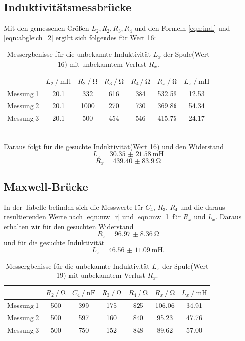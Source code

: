 \subsection{Induktivitätsmessbrücke}
Mit den gemessenen Größen $L_2, R_2, R_3, R_4$ und den Formeln \eqref{eqn:indl} und \eqref{eqn:abgleich_2} ergibt sich folgendes für Wert 16:
\begin{table}
  \centering
  \label{tab:c_16}
  \begin{tabular}{c|cccccc}
    \toprule
    & {$L_2 \:/\: \si{\milli\henry}$} & {$R_2\:/\: \si{\ohm}$} & {$R_3\:/\: \si{\ohm}$} & {$R_4\:/\: \si{\ohm}$} & {$R_x\:/\: \si{\ohm}$} & {$L_x \:/\: \si{\milli \henry}$} \\
    \midrule
    {Messung 1} & 20.1 & 332 & 616 & 384 & 532.58 & 12.53\\
    {Messung 2} & 20.1 & 1000 & 270 & 730 & 369.86 & 54.34\\
    {Messung 3} & 20.1 & 500 & 454 & 546 & 415.75 & 24.17\\
    \bottomrule
  \end{tabular}
  \caption{Messergbenisse für die unbekannte Induktivität $L_x$ der Spule(Wert 16) mit unbekanntem Verlust $R_x$.}
\end{table}
\\
Daraus folgt für die gesuchte Induktivität(Wert 16) und den Widerstand
\begin{equation*}
  L_x = \SI{30.35(2158)}{\milli\henry}
\end{equation*}
\begin{equation*}
  R_x = \SI{439.40(8390)}{\ohm}
\end{equation*}
\subsection{Maxwell-Brücke}
In der Tabelle befinden sich die Messwerte für $C_4$, $R_3$, $R_4$ und die daraus resultierenden Werte nach \eqref{eqn:mw_r}
und \eqref{eqn:mw_l} für $R_x$ und $L_x$. Daraus erhalten wir für den gesuchten Widerstand
\begin{equation*}
  R_x = \SI{96.97(836)}{\ohm}
\end{equation*}
und für die gesuchte Induktivität
\begin{equation*}
  L_x = \SI{46.56(1109)}{\milli \henry} .
\end{equation*}
\begin{table}
  \centering
  \label{tab:d_19}
  \begin{tabular}{c|cccccc}
    \toprule
                & {$R_2\:/\: \si{\ohm}$} & {$C_4 \:/\: \si{\nano \farad}$} & {$R_3\:/\: \si{\ohm}$} & {$R_4\:/\: \si{\ohm}$} & {$R_x\:/\: \si{\ohm}$} & {$L_x \:/\: \si{\milli \henry}$} \\
    \midrule
    {Messung 1} & 500 & 399 & 175 & 825 & 106.06 & 34.91 \\
    {Messung 2} & 500 & 597 & 160 & 840 & 95.23 & 47.76 \\
    {Messung 3} & 500 & 750 & 152 & 848 & 89.62 & 57.00 \\
    \bottomrule
  \end{tabular}
  \caption{Messergbenisse für die unbekannte Induktivität $L_x$ der Spule(Wert 19) mit unbekanntem Verlust $R_x$.}
\end{table}
